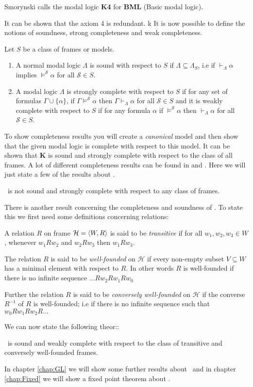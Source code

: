 \documentclass[../main.tex]{subfiles}
\begin{document}
Smorynski calls the modal logic \textbf{K4} for \textbf{BML} (Basic modal
logic).


It can be shown that the axiom 4 is redundant. k
It is now possible to define the notions of soundness, strong completeness and
weak completeness.
\begin{defi}
	Let $S$ be a class of frames or models.
	\begin{enumerate}
		\item A normal modal logic $\Lambda$ is sound with respect to $S$ if
		$\Lambda\subseteq\Lambda_S$, i.e if $\vdash_\Lambda\alpha$
		implies $\vDash^\mathcal{S}\alpha$ for all $\mathcal{S}\in S$.
	\item A modal logic $\Lambda$ is strongly complete with respect to $S$
		if for any set of formulas $\Gamma\cup\{\alpha\}$, if
		$\Gamma\vDash^\mathcal{S}\alpha$ then
		$\Gamma\vdash_\Lambda\alpha$ for all $\mathcal{S}\in S$ and it
		is weakly complete with respect to $S$ if for any formula
		$\alpha$ if $\vDash^\mathcal{S}\alpha$ then
		$\vdash_\Lambda\alpha$ for all $\mathcal{S}\in S$.
	\end{enumerate}
\end{defi}
To show completeness results you will create a \textit{canonical} model and
then show that the given modal logic is complete with respect to this model. It
can be shown that \textbf{K} is sound and strongly complete with respect to the
class of all frames. A lot of different completeness results can be found in
\cite{Lemmon1977} and \cite{Blackburn2002}. Here we will just state a few of
the results about \GL.

\begin{thm}
	\GL\ is not sound and strongly complete with respect to any class of
	frames.
\end{thm}

There is another result concerning the completeness and soundness of \GL. To
state this we first need some definitions concerning relations:
\begin{defi}
	A relation $R$ on frame $\mathcal{H}=\langle W,R\rangle$ is said to be
	\textit{transitive} if for all $w_1,w_2,w_3\in W$, whenever $w_1Rw_2$
	and $w_2Rw_3$ then $w_1Rw_3$.
	
	The relation $R$ is said to be \textit{well-founded} on
	$\mathcal{H}$ if every non-empty  subset $V\subseteq W$ has a minimal
	element with respect to $R$. In other words $R$ is well-founded if
	there is no infinite sequence $\ldots Rw_2Rw_1Rw_0$

	Further the relation $R$ is said to be \textit{conversely well-founded}
	on $\mathcal{H}$ if the converse $R^{-1}$ of $R$ is well-founded; i.e
	if there is no infinite sequence such that $w_0Rw_1Rw_2R\ldots$
\end{defi}
We can now state the following theor::
\begin{thm}
	\label{thm:GLcomplete}
	\GL\ is sound and weakly complete with respect to the class of
	transitive and conversely well-founded frames.
\end{thm}
In chapter \ref{chap:GL} we will show some further results about \GL\ and in
chapter
\ref{chap:Fixed} we will show a fixed point theorem about \GL.
\end{document}
